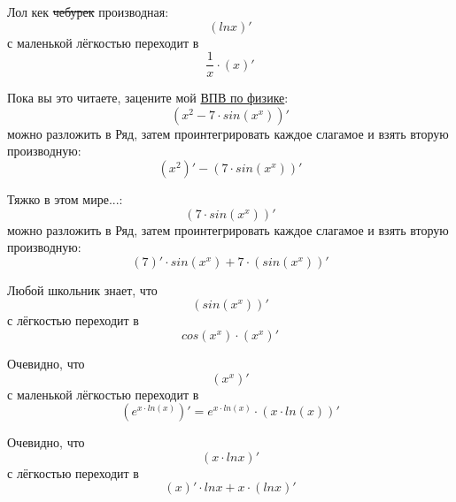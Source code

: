 \documentclass[a4paper, 12pt]{article}
\begin{document}
Лол кек \sout{чебурек} производная:
\begin{equation}
\left(lnx \right)'
\end{equation}
с маленькой лёгкостью переходит в
\begin{equation}
\frac{1}{x} \cdot \left(x \right)'
\end{equation}

Пока вы это читаете, зацените мой \href{https://drive.google.com/drive/folders/1cQOob8lLqhboZnilkguOm7CtLHlbPb1G?usp=sharing}{ВПВ по физике}:
\begin{equation}
\left(x^{2} - 7 \cdot sin\left(x^{x}\right) \right)'
\end{equation}
можно разложить в Ряд, затем проинтегрировать каждое слагамое и взять вторую производную:
\begin{equation}
\left(x^{2} \right)' - \left( 7 \cdot sin\left(x^{x}\right) \right)'
\end{equation}

Тяжко в этом мире...:
\begin{equation}
\left(7 \cdot sin\left(x^{x}\right) \right)'
\end{equation}
можно разложить в Ряд, затем проинтегрировать каждое слагамое и взять вторую производную:
\begin{equation}
\left(7 \right)' \cdot sin\left(x^{x}\right) + 7\cdot \left( sin\left(x^{x}\right) \right)'
\end{equation}

Любой школьник знает, что
\begin{equation}
\left(sin\left(x^{x}\right) \right)'
\end{equation}
с лёгкостью переходит в
\begin{equation}
cos \left( x^{x} \right) \cdot \left( x^{x} \right)'
\end{equation}

Очевидно, что
\begin{equation}
\left(x^{x} \right)'
\end{equation}
с маленькой лёгкостью переходит в
\begin{equation}
\left(e^{x\cdot ln \left(x \right)}  \right)' = e^{x\cdot ln \left(x \right)} \cdot \left( x\cdot ln \left(x \right) \right)'
\end{equation}

Очевидно, что
\begin{equation}
\left(x \cdot lnx \right)'
\end{equation}
с лёгкостью переходит в
\begin{equation}
\left(x \right)' \cdot lnx + x\cdot \left( lnx \right)'
\end{equation}
\end{document}
